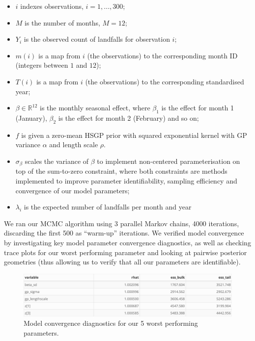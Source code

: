 \documentclass[
]{article}
\providecommand{\tightlist}{%
  \setlength{\itemsep}{0pt}\setlength{\parskip}{0pt}}
\begin{document}
\begin{itemize}
\tightlist
\item
  \(i\) indexes observations, \(i=1,...,300\);
\item
  \(M\) is the number of months, \(M = 12\);
\item
  \(Y_{i}\) is the observed count of landfalls for observation \(i\);
\item
  \(m(i)\) is a map from \(i\) (the observations) to the corresponding month ID (integers between \(1\) and \(12\));
\item
  \(T(i)\) is a map from \(i\) (the observations) to the corresponding standardised year;
\item
  \(\beta \in \mathbb{R}^{12}\) is the monthly seasonal effect, where \(\beta_1\) is the effect for month 1 (January), \(\beta_2\) is the effect for month 2 (February) and so on;
\item
  \(f\) is given a zero-mean HSGP prior with squared exponential kernel with GP variance \(\alpha\) and length scale \(\rho\).\\
\item
  \(\sigma_{\beta}\) scales the variance of \(\beta\) to implement non-centered parameterisation on top of the sum-to-zero constraint, where both constraints are methods implemented to improve parameter identifiability, sampling efficiency and convergence of our model parameters;
\item
  \(\lambda_{i}\) is the expected number of landfalls per month and year
\end{itemize}

We ran our MCMC algorithm using 3 parallel Markov chains, 4000 iterations, discarding the first 500 as ``warm-up'' iterations. We verified model convergence by investigating key model parameter convergence diagnostics, as well as checking trace plots for our worst performing parameter and looking at pairwise posterior geometries (thus allowing us to verify that all our parameters are identifiable).

\begin{figure}

{\centering \includegraphics[width=1\linewidth]{../outputs/bayesian-analysis-monthly-freq/model-HSGP/HSGP-model-diagnostics} 

}

\caption{Model convergence diagnostics for our 5 worst performing parameters.}\label{fig:figs9}
\end{figure}
\end{document}
